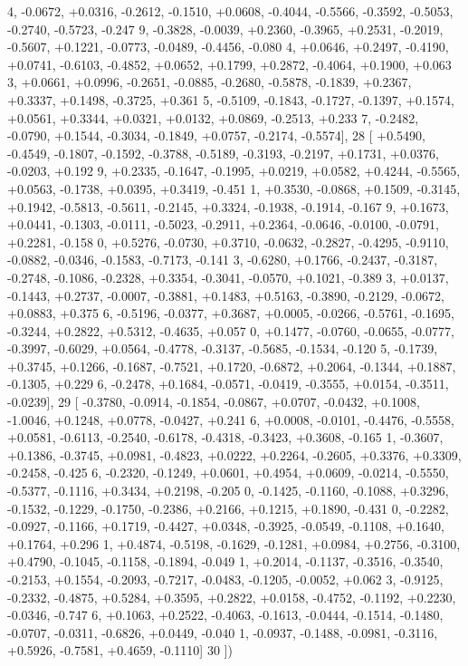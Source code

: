 \begin{DoxyCode}
      4, -0.0672, +0.0316, -0.2612, -0.1510, +0.0608, -0.4044, -0.5566, -0.3592, -0.5053, -0.2740, -0.5723, -0.247
      9, -0.3828, -0.0039, +0.2360, -0.3965, +0.2531, -0.2019, -0.5607, +0.1221, -0.0773, -0.0489, -0.4456, -0.080
      4, +0.0646, +0.2497, -0.4190, +0.0741, -0.6103, -0.4852, +0.0652, +0.1799, +0.2872, -0.4064, +0.1900, +0.063
      3, +0.0661, +0.0996, -0.2651, -0.0885, -0.2680, -0.5878, -0.1839, +0.2367, +0.3337, +0.1498, -0.3725, +0.361
      5, -0.5109, -0.1843, -0.1727, -0.1397, +0.1574, +0.0561, +0.3344, +0.0321, +0.0132, +0.0869, -0.2513, +0.233
      7, -0.2482, -0.0790, +0.1544, -0.3034, -0.1849, +0.0757, -0.2174, -0.5574],
28 [ +0.5490, -0.4549, -0.1807, -0.1592, -0.3788, -0.5189, -0.3193, -0.2197, +0.1731, +0.0376, -0.0203, +0.192
      9, +0.2335, -0.1647, -0.1995, +0.0219, +0.0582, +0.4244, -0.5565, +0.0563, -0.1738, +0.0395, +0.3419, -0.451
      1, +0.3530, -0.0868, +0.1509, -0.3145, +0.1942, -0.5813, -0.5611, -0.2145, +0.3324, -0.1938, -0.1914, -0.167
      9, +0.1673, +0.0441, -0.1303, -0.0111, -0.5023, -0.2911, +0.2364, -0.0646, -0.0100, -0.0791, +0.2281, -0.158
      0, +0.5276, -0.0730, +0.3710, -0.0632, -0.2827, -0.4295, -0.9110, -0.0882, -0.0346, -0.1583, -0.7173, -0.141
      3, -0.6280, +0.1766, -0.2437, -0.3187, -0.2748, -0.1086, -0.2328, +0.3354, -0.3041, -0.0570, +0.1021, -0.389
      3, +0.0137, -0.1443, +0.2737, -0.0007, -0.3881, +0.1483, +0.5163, -0.3890, -0.2129, -0.0672, +0.0883, +0.375
      6, -0.5196, -0.0377, +0.3687, +0.0005, -0.0266, -0.5761, -0.1695, -0.3244, +0.2822, +0.5312, -0.4635, +0.057
      0, +0.1477, -0.0760, -0.0655, -0.0777, -0.3997, -0.6029, +0.0564, -0.4778, -0.3137, -0.5685, -0.1534, -0.120
      5, -0.1739, +0.3745, +0.1266, -0.1687, -0.7521, +0.1720, -0.6872, +0.2064, -0.1344, +0.1887, -0.1305, +0.229
      6, -0.2478, +0.1684, -0.0571, -0.0419, -0.3555, +0.0154, -0.3511, -0.0239],
29 [ -0.3780, -0.0914, -0.1854, -0.0867, +0.0707, -0.0432, +0.1008, -1.0046, +0.1248, +0.0778, -0.0427, +0.241
      6, +0.0008, -0.0101, -0.4476, -0.5558, +0.0581, -0.6113, -0.2540, -0.6178, -0.4318, -0.3423, +0.3608, -0.165
      1, -0.3607, +0.1386, -0.3745, +0.0981, -0.4823, +0.0222, +0.2264, -0.2605, +0.3376, +0.3309, -0.2458, -0.425
      6, -0.2320, -0.1249, +0.0601, +0.4954, +0.0609, -0.0214, -0.5550, -0.5377, -0.1116, +0.3434, +0.2198, -0.205
      0, -0.1425, -0.1160, -0.1088, +0.3296, -0.1532, -0.1229, -0.1750, -0.2386, +0.2166, +0.1215, +0.1890, -0.431
      0, -0.2282, -0.0927, -0.1166, +0.1719, -0.4427, +0.0348, -0.3925, -0.0549, -0.1108, +0.1640, +0.1764, +0.296
      1, +0.4874, -0.5198, -0.1629, -0.1281, +0.0984, +0.2756, -0.3100, +0.4790, -0.1045, -0.1158, -0.1894, -0.049
      1, +0.2014, -0.1137, -0.3516, -0.3540, -0.2153, +0.1554, -0.2093, -0.7217, -0.0483, -0.1205, -0.0052, +0.062
      3, -0.9125, -0.2332, -0.4875, +0.5284, +0.3595, +0.2822, +0.0158, -0.4752, -0.1192, +0.2230, -0.0346, -0.747
      6, +0.1063, +0.2522, -0.4063, -0.1613, -0.0444, -0.1514, -0.1480, -0.0707, -0.0311, -0.6826, +0.0449, -0.040
      1, -0.0937, -0.1488, -0.0981, -0.3116, +0.5926, -0.7581, +0.4659, -0.1110]
30 ])
\end{DoxyCode}
